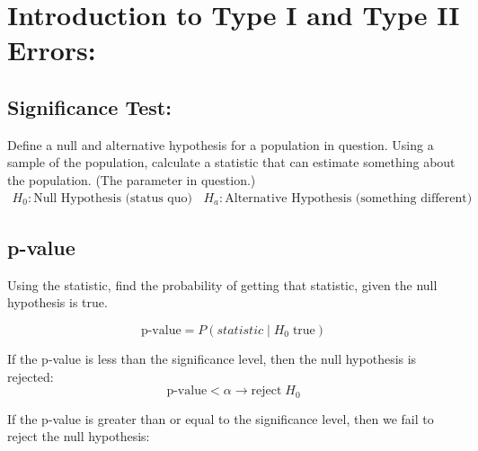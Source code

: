 \documentclass[12pt]{article}
\begin{document}
\section*{Introduction to Type I and Type II Errors:}
\subsection*{Significance Test:}
Define a null and alternative hypothesis for a population in question. Using a sample of the population, calculate a statistic that can estimate something about the population. (The parameter in question.)
\begin{align}
  H_{0}: \text{Null Hypothesis (status quo)} &&
  H_{a}: \text{Alternative Hypothesis (something different)}
\end{align}

\begin{center}
\end{center}
\subsection*{p-value}
Using the statistic, find the probability of getting that statistic, given the null hypothesis is true.

\begin{equation}
  \text{p-value} = P(statistic \mid H_{0} \; \text{true})
\end{equation}

If the p-value is less than the significance level, then the null hypothesis is rejected:
\begin{equation}
  \text{p-value}< \alpha \rightarrow \text{reject}\; H_{0}
\end{equation}

If the p-value is greater than or equal to the significance level, then we fail to reject the null hypothesis:
\end{document}

